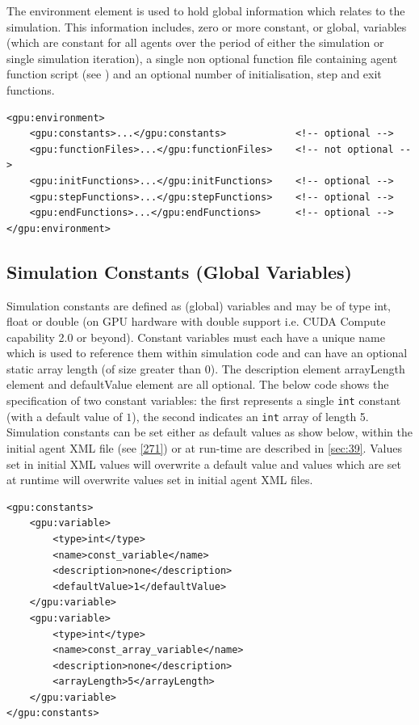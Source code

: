 \documentclass[11pt, a4paper, onecolumn, oneside]{report}
\begin{document}
The environment element is used to hold global information which relates to the simulation.
This information includes, zero or more constant, or global, variables (which are constant for all agents over the period of either the simulation or single simulation iteration), a single non optional function file containing agent function script (see ) and an optional number of initialisation, step and exit functions.

\begin{verbatim}
<gpu:environment>
    <gpu:constants>...</gpu:constants>            <!-- optional -->
    <gpu:functionFiles>...</gpu:functionFiles>    <!-- not optional -->
    <gpu:initFunctions>...</gpu:initFunctions>    <!-- optional -->
    <gpu:stepFunctions>...</gpu:stepFunctions>    <!-- optional -->
    <gpu:endFunctions>...</gpu:endFunctions>      <!-- optional -->
</gpu:environment>
\end{verbatim}

\subsection{Simulation Constants (Global Variables)}
\label{sec:221}

Simulation constants are defined as (global) variables and may be of type int, float or double (on GPU hardware with double support i.e. CUDA Compute capability 2.0 or beyond).
Constant variables must each have a unique name which is used to reference them within simulation code and can have an optional static array length (of size greater than 0).
The description element arrayLength element and defaultValue element are all optional.
The below code shows the specification of two constant variables: the first represents a single \texttt{int} constant (with a default value of $1$), the second indicates an \texttt{int} array of length 5.
Simulation constants can be set either as default values as show below, within the initial agent XML file (see \cref{271}) or at run-time are described in \cref{sec:39}. Values set in initial XML values will overwrite a default value and values which are set at runtime will overwrite values set in initial agent XML files.

\begin{verbatim}
<gpu:constants>
    <gpu:variable>
        <type>int</type>
        <name>const_variable</name>
        <description>none</description>
        <defaultValue>1</defaultValue>
    </gpu:variable>
    <gpu:variable>
        <type>int</type>
        <name>const_array_variable</name>
        <description>none</description>
        <arrayLength>5</arrayLength>
    </gpu:variable>
</gpu:constants>
\end{verbatim}
\end{document}
